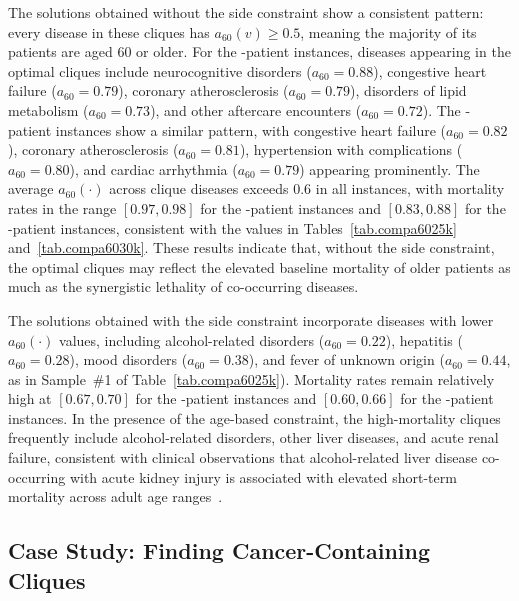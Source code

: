 The solutions obtained without the side constraint show a consistent
pattern: every disease in these cliques has $a_{60}(v) \ge 0.5$,
meaning the majority of its patients are aged 60 or older. For the
-patient instances, diseases appearing in the optimal
cliques include neurocognitive disorders ($a_{60} = 0.88$), congestive
heart failure ($a_{60} = 0.79$), coronary atherosclerosis
($a_{60} = 0.79$), disorders of lipid metabolism ($a_{60} = 0.73$),
and other aftercare encounters ($a_{60} = 0.72$). The
-patient instances show a similar pattern, with
congestive heart failure ($a_{60} = 0.82$), coronary atherosclerosis
($a_{60} = 0.81$), hypertension with complications ($a_{60} = 0.80$),
and cardiac arrhythmia ($a_{60} = 0.79$) appearing prominently. The
average $a_{60}(\cdot)$ across clique diseases exceeds 0.6 in all
instances, with mortality rates in the range $[0.97, 0.98]$ for the
-patient instances and $[0.83, 0.88]$ for the
-patient instances, consistent with the values in
Tables~\ref{tab.compa6025k} and~\ref{tab.compa6030k}. These results
indicate that, without the side constraint, the optimal cliques may
reflect the elevated baseline mortality of older patients as much as
the synergistic lethality of co-occurring diseases.

The solutions obtained with the side constraint incorporate diseases
with lower $a_{60}(\cdot)$ values, including alcohol-related disorders
($a_{60} = 0.22$), hepatitis ($a_{60} = 0.28$), mood disorders
($a_{60} = 0.38$), and fever of unknown origin ($a_{60} = 0.44$, as
in Sample~\#1 of Table~\ref{tab.compa6025k}). Mortality rates remain
relatively high at $[0.67, 0.70]$ for the -patient
instances and $[0.60, 0.66]$ for the -patient
instances. In the presence of the age-based constraint, the
high-mortality cliques frequently include alcohol-related disorders,
other liver diseases, and acute renal failure, consistent with
clinical observations that alcohol-related liver disease co-occurring
with acute kidney injury is associated with elevated short-term
mortality across adult age ranges~\citep{altamirano2012acute}.

\subsection{Case Study: Finding Cancer-Containing
Cliques}\label{sec.CancerSide}

